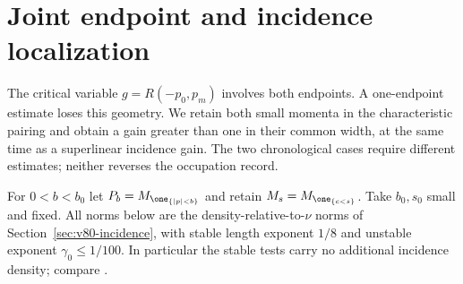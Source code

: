 \section{Joint endpoint and incidence localization}
\label{sec:v81-joint}
The critical variable $g=R(-p_0,p_m)$ involves both endpoints.
A one-endpoint estimate loses this geometry. We retain both small
momenta in the characteristic pairing and obtain a gain greater
than one in their common width, at the same time as a superlinear
incidence gain. The two chronological cases require different
estimates; neither reverses the occupation record.

For $0<b<b_0$ let $P_b=M_{\one_{\{|p|<b\}}}$ and retain
$M_s=M_{\one_{\{c<s\}}}$. Take $b_0,s_0$ small and fixed.
All norms below are the density-relative-to-$\nu$ norms of
Section~\ref{sec:v80-incidence}, with stable length exponent $1/8$
and unstable exponent $\gamma_0\le1/100$. In particular the stable
tests carry no additional incidence density; compare
\cite[Section 3.1, equations (10)--(12)]{DPZ}.

